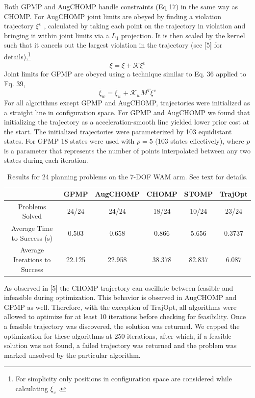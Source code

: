 \documentclass{IEEEtran}
\begin{document}
Both GPMP and AugCHOMP handle constraints (Eq 17)
in the same way as CHOMP. For AugCHOMP joint limits
are obeyed by finding a violation trajectory $\xi^v$
, calculated by
taking each point on the trajectory in violation and bringing
it within joint limits via a $L_1$ projection. It is then scaled by
the kernel such that it cancels out the largest violation in the
trajectory (see [5] for details),\footnote{For simplicity only positions in configuration space are considered while
calculating $\xi_v$
.}
\begin{equation*}
\overline{\xi}=\overline{\xi}+\mathcal{K}\xi^v
\tag{39}
\end{equation*}
Joint limits for GPMP are obeyed using a technique similar
to Eq. 36 applied to Eq. 39,
\begin{equation*}
\overline{\xi}_w=\overline{\xi}_w+\mathcal{K}_wM^T\xi^v
\tag{40}
\end{equation*}
For all algorithms except GPMP and AugCHOMP, trajectories were initialized as a straight line in configuration space.
For GPMP and AugCHOMP we found that initializing the
trajectory as a acceleration-smooth line yielded lower prior
cost at the start. The initialized trajectories were parameterized by 103 equidistant states. For GPMP 18 states were used
with $p = 5$ (103 states effectively), where $p$ is a parameter
that represents the number of points interpolated between
any two states during each iteration.
\begin{table}[htp]
\centering
\caption{Results for 24 planning problems on the 7-DOF WAM arm. See text for details.}
\begin{tabular}{|c| c c c c c|}
\hline
&GPMP&AugCHOMP&CHOMP&STOMP&TrajOpt\\
\hline \hline
Problems Solved&24/24&24/24&18/24&10/24&23/24\\
Average Time to Success (s)&0.503&0.658&0.866&5.656&0.3737\\
Average Iterations to Success &22.125&22.958&38.378&82.837&6.087\\
\hline
\end{tabular}
\end{table}
As observed in [5] the CHOMP trajectory can oscillate
between feasible and infeasible during optimization. This
behavior is observed in AugCHOMP and GPMP as well.
Therefore, with the exception of TrajOpt, all algorithms were
allowed to optimize for at least 10 iterations before checking
for feasibility. Once a feasible trajectory was discovered, the
solution was returned. We capped the optimization for these
algorithms at 250 iterations, after which, if a feasible solution
was not found, a failed trajectory was returned and the
problem was marked unsolved by the particular algorithm.
\end{document}
